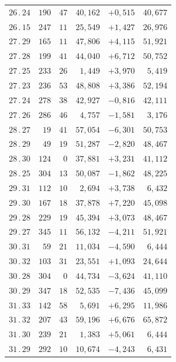 \begin{center}
\begin{tabular}[t]{|c|r@{\;}r@{\;}r|r|r|}
$26\, .\, 24$ & $190$ & $47$ & $40{,}162$ & $+0{,}515$ & $40{,}677$\\
$26\, .\, 15$ & $247$ & $11$ & $25{,}549$ & $+1{,}427$ & $26{,}976$\\[7pt]
$27\, .\, 29$ & $165$ & $11$ & $47{,}806$ & $+4{,}115$ & $51{,}921$\\
$27\, .\, 28$ & $199$ & $41$ & $44{,}040$ & $+6{,}712$ & $50{,}752$\\
$27\, .\, 25$ & $233$ & $26$ & $1{,}449$ & $+3{,}970$ & $5{,}419$\\
$27\, .\, 23$ & $236$ & $53$ & $48{,}808$ & $+3{,}386$ & $52{,}194$\\
$27\, .\, 24$ & $278$ & $38$ & $42{,}927$ & $-0{,}816$ & $42{,}111$\\
$27\, .\, 26$ & $286$ & $46$ & $4{,}757$ & $-1{,}581$ & $3{,}176$\\[7pt]
$28\, .\, 27$ & $19$ & $41$ & $57{,}054$ & $-6{,}301$ & $50{,}753$\\
$28\, .\, 29$ & $49$ & $19$ & $51{,}287$ & $-2{,}820$ & $48{,}467$\\
$28\, .\, 30$ & $124$ & $0$ & $37{,}881$ & $+3{,}231$ & $41{,}112$\\
$28\, .\, 25$ & $304$ & $13$ & $50{,}087$ & $-1{,}862$ & $48{,}225$\\[7pt]
$29\, .\, 31$ & $112$ & $10$ & $2{,}694$ & $+3{,}738$ & $6{,}432$\\
$29\, .\, 30$ & $167$ & $18$ & $37{,}878$ & $+7{,}220$ & $45{,}098$\\
$29\, .\, 28$ & $229$ & $19$ & $45{,}394$ & $+3{,}073$ & $48{,}467$\\
$29\, .\, 27$ & $345$ & $11$ & $56{,}132$ & $-4{,}211$ & $51{,}921$\\[7pt]
$30\, .\, 31$ & $59$ & $21$ & $11{,}034$ & $-4{,}590$ & $6{,}444$\\
$30\, .\, 32$ & $103$ & $31$ & $23{,}551$ & $+1{,}093$ & $24{,}644$\\
$30\, .\, 28$ & $304$ & $0$ & $44{,}734$ & $-3{,}624$ & $41{,}110$\\
$30\, .\, 29$ & $347$ & $18$ & $52{,}535$ & $-7{,}436$ & $45{,}099$\\[7pt]
$31\, .\, 33$ & $142$ & $58$ & $5{,}691$ & $+6{,}295$ & $11{,}986$\\
$31\, .\, 32$ & $207$ & $43$ & $59{,}196$ & $+6{,}676$ & $65{,}872$\\
$31\, .\, 30$ & $239$ & $21$ & $1{,}383$ & $+5{,}061$ & $6{,}444$\\
$31\, .\, 29$ & $292$ & $10$ & $10{,}674$ & $-4{,}243$ & $6{,}431$\\[7pt]

\end{tabular}
\end{center}
